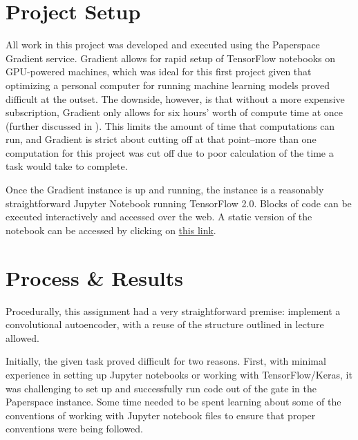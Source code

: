 \documentclass{article}
\begin{document}
  
  \graphicspath{{./images/}}

\section{Project Setup}
\par All work in this project was developed and executed using the Paperspace Gradient service.
Gradient allows for rapid setup of TensorFlow notebooks on GPU-powered machines, which was ideal for this first project given that optimizing a personal computer for running machine learning models proved difficult at the outset.
The downside, however, is that without a more expensive subscription, Gradient only allows for six hours' worth of compute time at once (further discussed in ).
This limits the amount of time that computations can run, and Gradient is strict about cutting off at that point--more than one computation for this project was cut off due to poor calculation of the time a task would take to complete.

\par Once the Gradient instance is up and running, the instance is a reasonably straightforward Jupyter Notebook running TensorFlow 2.0.
Blocks of code can be executed interactively and accessed over the web.
A static version of the notebook can be accessed by clicking on \href{https://console.paperspace.com/te7vzjiu3/notebook/prz0iko1d}{this link}.

\section{Process \& Results} \label{procresults}
\par Procedurally, this assignment had a very straightforward premise: implement a convolutional autoencoder, with a reuse of the structure outlined in lecture allowed.

\par Initially, the given task proved difficult for two reasons. 
First, with minimal experience in setting up Jupyter notebooks or working with TensorFlow/Keras, it was challenging to set up and successfully run code out of the gate in the Paperspace instance.
Some time needed to be spent learning about some of the conventions of working with Jupyter notebook files to ensure that proper conventions were being followed.
\end{document}
